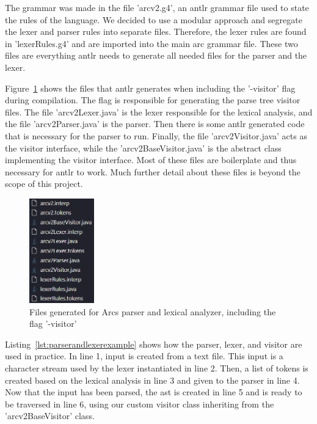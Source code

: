 The grammar was made in the file 'arcv2.g4', an \gls{antlr} grammar file used to state the rules of the language. We decided to use a modular approach and segregate the lexer and parser rules into separate files. Therefore, the lexer rules are found in 'lexerRules.g4' and are imported into the main arc grammar file. These two files are everything \gls{antlr} needs to generate all needed files for the parser and the lexer.

Figure~\ref{fig:lexerandparserfiles} shows the files that \gls{antlr} generates when including the '-visitor' flag during compilation. The flag is responsible for generating the parse tree visitor files. The file 'arcv2Lexer.java' is the lexer responsible for the lexical analysis, and the file 'arcv2Parser.java' is the parser. Then there is some \gls{antlr} generated code that is necessary for the parser to run. Finally, the file 'arcv2Visitor.java' acts as the visitor interface, while the 'arcv2BaseVisitor.java' is the abstract class implementing the visitor interface. Most of these files are boilerplate and thus necessary for \gls{antlr} to work. Much further detail about these files is beyond the scope of this project.


\begin{figure}[htb!]
    \begin{center}
        \includegraphics[width=0.25\textwidth]{figures/lexerAndParserFiles.png}
        \caption{Files generated for Arcs parser and lexical analyzer, including the flag '-visitor'}
        \label{fig:lexerandparserfiles}
    \end{center}
\end{figure}


Listing~\ref{lst:parserandlexerexample} shows how the parser, lexer, and visitor are used in practice. In line 1, input is created from a text file. This input is a character stream used by the lexer instantiated in line 2. Then, a list of tokens is created based on the lexical analysis in line 3 and given to the parser in line 4. Now that the input has been parsed, the \gls{ast} is created in line 5 and is ready to be traversed in line 6, using our custom visitor class inheriting from the 'arcv2BaseVisitor' class.


